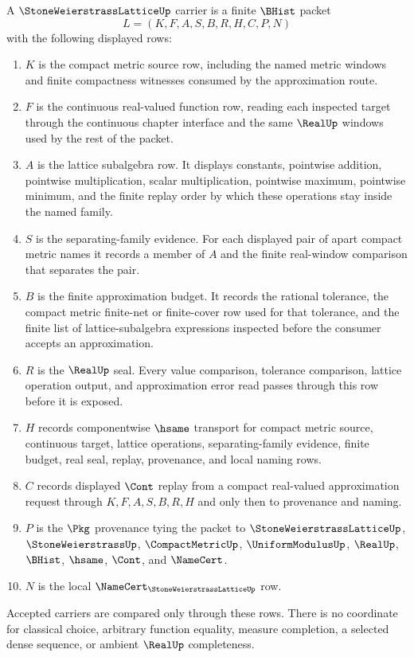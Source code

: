 \begin{definition}
\label{def:stone-weierstrass-lattice-carrier}
A $\StoneWeierstrassLatticeUp$ carrier is a finite $\BHist$ packet
$$
L=(K,F,A,S,B,R,H,C,P,N)
$$
with the following displayed rows:
\begin{enumerate}
\item $K$ is the compact metric source row, including the named metric windows and finite compactness witnesses consumed by the approximation route.
\item $F$ is the continuous real-valued function row, reading each inspected target through the continuous chapter interface and the same $\RealUp$ windows used by the rest of the packet.
\item $A$ is the lattice subalgebra row. It displays constants, pointwise addition, pointwise multiplication, scalar multiplication, pointwise maximum, pointwise minimum, and the finite replay order by which these operations stay inside the named family.
\item $S$ is the separating-family evidence. For each displayed pair of apart compact metric names it records a member of $A$ and the finite real-window comparison that separates the pair.
\item $B$ is the finite approximation budget. It records the rational tolerance, the compact metric finite-net or finite-cover row used for that tolerance, and the finite list of lattice-subalgebra expressions inspected before the consumer accepts an approximation.
\item $R$ is the $\RealUp$ seal. Every value comparison, tolerance comparison, lattice operation output, and approximation error read passes through this row before it is exposed.
\item $H$ records componentwise $\hsame$ transport for compact metric source, continuous target, lattice operations, separating-family evidence, finite budget, real seal, replay, provenance, and local naming rows.
\item $C$ records displayed $\Cont$ replay from a compact real-valued approximation request through $K,F,A,S,B,R,H$ and only then to provenance and naming.
\item $P$ is the $\Pkg$ provenance tying the packet to $\StoneWeierstrassLatticeUp$, $\StoneWeierstrassUp$, $\CompactMetricUp$, $\UniformModulusUp$, $\RealUp$, $\BHist$, $\hsame$, $\Cont$, and $\NameCert$.
\item $N$ is the local $\NameCert_{\StoneWeierstrassLatticeUp}$ row.
\end{enumerate}
Accepted carriers are compared only through these rows. There is no coordinate for classical choice, arbitrary function equality, measure completion, a selected dense sequence, or ambient $\RealUp$ completeness.
\end{definition}

